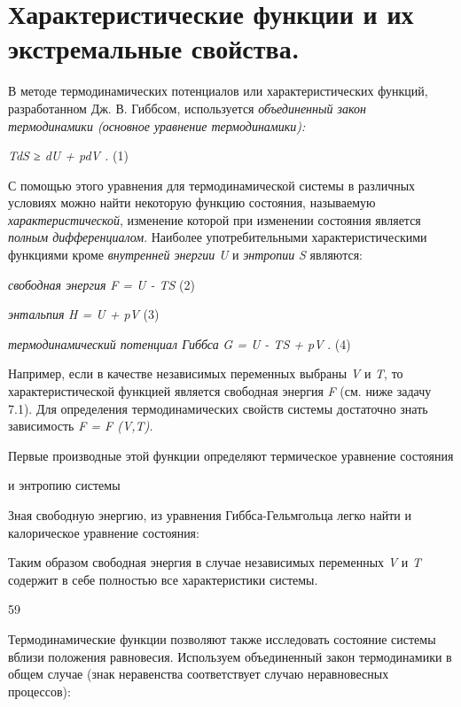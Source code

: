 \chapter{Характеристические функции и их экстремальные
свойства.}

В методе термодинамических потенциалов или характеристических функций,
разработанном Дж. В. Гиббсом, используется \emph{объединенный закон
термодинамики (основное уравнение термодинамики):}

\emph{TdS ≥ dU + pdV .} (1)

С помощью этого уравнения для термодинамической системы в различных
условиях можно найти некоторую функцию состояния, называемую
\emph{характеристической}, изменение которой при изменении состояния
является \emph{полным дифференциалом}. Наиболее употребительными
характеристическими функциями кроме \emph{внутренней энергии} \emph{U} и
\emph{энтропии} \emph{S} являются:

\emph{свободная энергия} \emph{F = U - TS} (2)

\emph{энтальпия} \emph{H = U + pV} (3)

\emph{термодинамический потенциал Гиббса} \emph{G = U - TS + pV} . (4)

Например, если в качестве независимых переменных выбраны \emph{V} и
\emph{T}, то характеристической функцией является свободная энергия
\emph{F} (см. ниже задачу 7.1). Для определения термодинамических
свойств системы достаточно знать зависимость \emph{F = F (V,T).}

Первые производные этой функции определяют термическое уравнение
состояния


и энтропию системы


Зная свободную энергию, из уравнения Гиббса-Гельмгольца легко найти и
калорическое уравнение состояния:


Таким образом свободная энергия в случае независимых переменных \emph{V}
и \emph{T} содержит в себе полностью все характеристики системы.

59

Термодинамические функции позволяют также исследовать состояние системы
вблизи положения равновесия. Используем объединенный закон термодинамики
в общем случае (знак неравенства соответствует случаю неравновесных
процессов):

